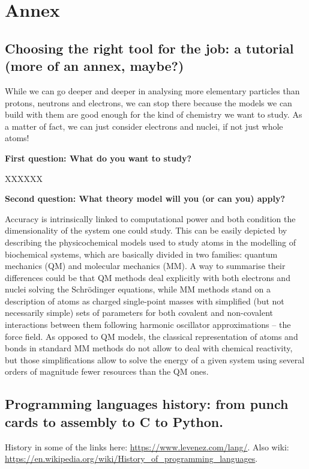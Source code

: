 \chapter{Annex}
\label{appendixA}

\section{Choosing the right tool for the job: a tutorial (more of an annex, maybe?)}
While we can go deeper and deeper in analysing more elementary particles than protons, neutrons and electrons, we can stop there because the models we can build with them are good enough for the kind of chemistry we want to study. As a matter of fact, we can just consider electrons and nuclei, if not just whole atoms!

\textbf{First question: What do you want to study?}

XXXXXX

\textbf{Second question: What theory model will you (or can you) apply?}

Accuracy is intrinsically linked to computational power and both condition the dimensionality of the system one could study. This can be easily depicted by describing the physicochemical models used to study atoms in the modelling of biochemical systems, which are basically divided in two families: quantum mechanics (QM) and molecular mechanics (MM). A way to summarise their differences could be that QM methods deal explicitly with both electrons and nuclei solving the Schrödinger equations, while MM methods stand on a description of atoms as charged single-point masses with simplified (but not necessarily simple) sets of parameters for both covalent and non-covalent interactions between them following harmonic oscillator approximations – the force field. As opposed to QM models, the classical representation of atoms and bonds in standard MM methods do not allow to deal with chemical reactivity, but those simplifications allow to solve the energy of a given system using several orders of magnitude fewer resources than the QM ones.

\section{Programming languages history: from punch cards to assembly to C to Python. }
History in some of the links here: \href{https://www.levenez.com/lang/}{https://www.levenez.com/lang/}. Also wiki: \href{https://en.wikipedia.org/wiki/History\_of\_programming\_languages}{https://en.wikipedia.org/wiki/History\_of\_programming\_languages}.

